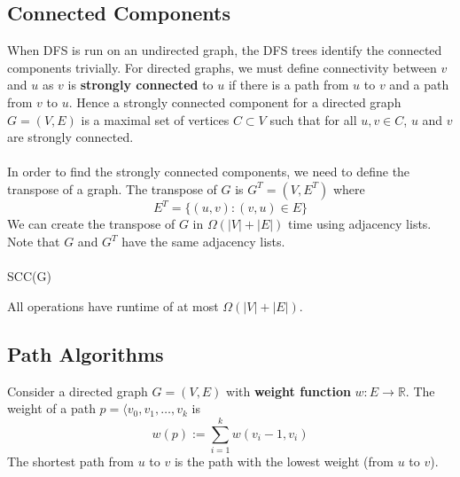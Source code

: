\documentclass{article}
\begin{document}
    \subsection{Connected Components}
        When DFS is run on an undirected graph, the DFS trees identify the connected components trivially. For directed graphs, we must define connectivity between $v$ and $u$ as $v$ is \textbf{strongly connected} to $u$ if there is a path from $u$ to $v$ and a path from $v$ to $u$. Hence a strongly connected component for a directed graph $G = (V, E)$ is a maximal set of vertices $C \subset V$ such that for all $u,v \in C$, $u$ and $v$ are strongly connected. \\ \\
        In order to find the strongly connected components, we need to define the transpose of a graph. The transpose of $G$ is $G^T = (V, E^T)$ where 
        \[ E^T = \{ (u,v) : (v, u) \in E \} \]
        We can create the transpose of $G$ in $\Omega(|V| + |E|)$ time using adjacency lists. Note that $G$ and $G^T$ have the same adjacency lists. \\ \\
        SCC(G)
        \begin{algorithmic}[1]
        \end{algorithmic}
        All operations have runtime of at most $\Omega(|V| + |E|)$.
    \subsection{Path Algorithms}
        Consider a directed graph $G = (V, E)$ with \textbf{weight function} $w : E \to \mathbb{R}$. The weight of a path $p = \langle v_0, v_1, \dots, v_k$ is
        \[ w(p) := \sum^k_{i=1} w(v_i-1,v_i) \]
        The shortest path from $u$ to $v$ is the path with the lowest weight (from $u$ to $v$).
\end{document}
